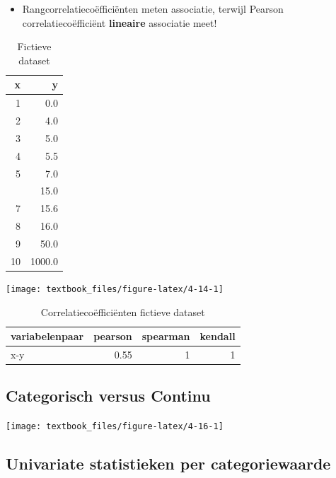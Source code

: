 \documentclass[]{tufte-book}
\providecommand{\tightlist}{%
  \setlength{\itemsep}{0pt}\setlength{\parskip}{0pt}}
\begin{document}
\begin{itemize}
\tightlist
\item
  Rangcorrelatiecoëfficiënten meten associatie, terwijl Pearson correlatiecoëfficiënt \textbf{lineaire} associatie meet!
\end{itemize}

\begin{table}

\caption{\label{tab:4-13}Fictieve dataset}
\centering
\fontsize{10}{12}\selectfont
\begin{tabular}[t]{rr}
\toprule
x & y\\
\midrule
1 & 0.0\\
2 & 4.0\\
3 & 5.0\\
4 & 5.5\\
5 & 7.0\\
\addlinespace
6 & 15.0\\
7 & 15.6\\
8 & 16.0\\
9 & 50.0\\
10 & 1000.0\\
\bottomrule
\end{tabular}
\end{table}

\texttt{[image: textbook\_files/figure-latex/4-14-1]}

\begin{table}

\caption{\label{tab:4-15}Correlatiecoëfficiënten fictieve dataset}
\centering
\fontsize{10}{12}\selectfont
\begin{tabular}[t]{lrrr}
\toprule
variabelenpaar & pearson & spearman & kendall\\
\midrule
x-y & 0.55 & 1 & 1\\
\bottomrule
\end{tabular}
\end{table}

\hypertarget{categorisch-versus-continu}{%
\subsection{Categorisch versus Continu}\label{categorisch-versus-continu}}

\texttt{[image: textbook\_files/figure-latex/4-16-1]}

\hypertarget{univariate-statistieken-per-categoriewaarde}{%
\subsection*{Univariate statistieken per categoriewaarde}\label{univariate-statistieken-per-categoriewaarde}}
\end{document}
